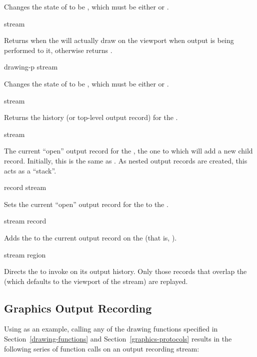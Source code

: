 Changes the state of  to be , which must
be either  or .

 {stream}

Returns  when the   will
actually draw on the viewport when output is being performed to it, otherwise
returns .

 {drawing-p stream}

Changes the state of  to be , which must
be either  or .

 {stream}

Returns the history (or top-level output record) for the  .

 {stream}

The current ``open'' output record for the 
, the one to which  will add a new
child record.  Initially, this is the same as .  As
nested output records are created, this acts as a ``stack''.

 {record stream}

Sets the current ``open'' output record for the 
 to the  .

 {stream record}

Adds the   to the current output record on the
  (that is,
).

 {stream \optional region}

Directs the   to invoke 
on its output history.  Only those records that overlap the 
 (which defaults to the viewport of the stream) are replayed.


\subsection {Graphics Output Recording}

Using  as an example, calling any of the drawing functions
specified in Section~\ref{drawing-functions} and
Section~\ref{graphics-protocols} results in the following series of function
calls on an output recording stream:

